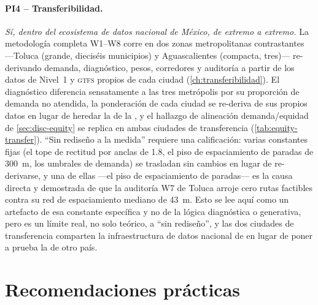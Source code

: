 \paragraph{PI4 -- Transferibilidad.} \emph{Sí, dentro del ecosistema de datos nacional
de México, de extremo a extremo.} La metodología
completa W1--W8 corre en dos zonas metropolitanas contrastantes
---Toluca (grande, dieciséis municipios) y Aguascalientes (compacta, tres)---
re-derivando demanda, diagnóstico, pesos, corredores y auditoría a partir de los datos de
Nivel~1 y \textsc{gtfs} propios de cada ciudad (\cref{ch:transferibilidad}). El diagnóstico
diferencia sensatamente a las tres metrópolis por su proporción de demanda no atendida, la
ponderación de cada ciudad se re-deriva de sus propios datos en lugar de heredar la de
la \zmg, y el hallazgo de alineación demanda/equidad de \cref{sec:disc-equity} se replica
en ambas ciudades de transferencia (\cref{tab:equity-transfer}). ``Sin rediseño a la
medida'' requiere una calificación: varias constantes fijas (el tope de rectitud por
anclas de \num{1.8}, el piso de espaciamiento de paradas de \SI{300}{\metre}, los
umbrales de demanda) se trasladan sin cambios en lugar de re-derivarse, y una de
ellas ---el piso de espaciamiento de paradas--- es la causa directa y demostrada de que
la auditoría W7 de Toluca arroje cero rutas factibles contra su red de espaciamiento
mediano de \SI{43}{\metre}. Esto se lee aquí como un artefacto de esa constante
específica y no de la lógica diagnóstica o generativa, pero es un límite real, no solo
teórico, a ``sin rediseño'', y las dos ciudades de transferencia comparten la
infraestructura de datos nacional de \zmg en lugar de poner a prueba la de otro país.

\section{Recomendaciones prácticas}
\label{sec:concl-recomendaciones}


